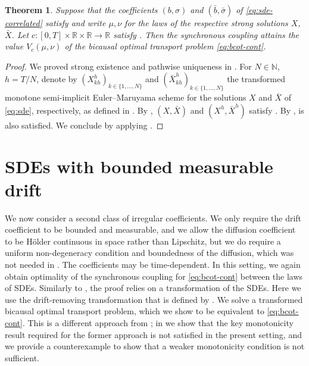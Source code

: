 \documentclass[onseside, final]{amsart}
\newtheorem{theorem}{Theorem}[section]
\theoremstyle{definition}
\newcommand{\N}{\mathbb N}
\newcommand{\R}{\mathbb R}
\numberwithin{equation}{section}
\begin{document}
		\begin{theorem}\label{thm:optimality-growth-disc}
			Suppose that the coefficients $(b, \sigma)$ and $(\bar b, \bar \sigma)$ of \eqref{eq:sde-correlated} satisfy  and write $\mu, \nu$ for the laws of the respective strong solutions $X$, $\bar X$. Let $c \colon [0, T] \times \R \times \R \to \R$ satisfy . Then the synchronous coupling attains the value $V_c(\mu, \nu)$ of the bicausal optimal transport problem \eqref{eq:bcot-cont}.
		\end{theorem}
		
		\begin{proof}
			We proved strong existence and pathwise uniqueness in . For $N \in \N$, $h = T/N$, denote by $(X^h_{kh})_{k \in \{1, \dotsc, N\}}$ and $(\bar X^h_{kh})_{k \in \{1, \dotsc, N\}}$ the transformed monotone semi-implicit Euler--Maruyama scheme for the solutions $X$ and $\bar X$ of \eqref{eq:sde}, respectively, as defined in . By , $(X, \bar X)$ and  $(X^h, \bar X^h)$ satisfy . By ,  is also satisfied. We conclude by applying .
		\end{proof}

\section{SDEs with bounded measurable drift}\label{sec:zvonkin}
	We now consider a second class of irregular coefficients. We only require the drift coefficient to be bounded and measurable, and we allow the diffusion coefficient to be H\"older continuous in space rather than Lipschitz, but we do require a uniform non-degeneracy condition and boundedness of the diffusion, which was not needed in . The coefficients may be time-dependent. In this setting, we again obtain optimality of the synchronous coupling for \eqref{eq:bcot-cont} between the laws of SDEs.
	Similarly to , the proof relies on a transformation of the SDEs. Here we use the drift-removing transformation that is defined by \citet[Theorem 1]{Zv74}. We solve a transformed bicausal optimal transport problem, which we show to be equivalent to \eqref{eq:bcot-cont}. This is a different approach from ; in  we show that the key monotonicity result required for the former approach is not satisfied in the present setting, and we provide a counterexample to show that a weaker monotonicity condition is not sufficient.
	
\end{document}

